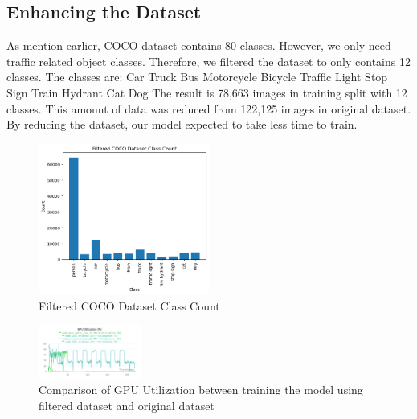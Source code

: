 \documentclass[conference]{IEEEtran}
\begin{document}
\subsection{Enhancing the Dataset}\label{Filtering}
As mention earlier, COCO dataset contains 80 classes. However, we only need traffic related object classes.
Therefore, we filtered the dataset to only contains 12 classes. The classes are:
Car Truck Bus Motorcycle Bicycle Traffic Light Stop Sign Train Hydrant Cat Dog
The result is 78,663 images in training split with 12 classes. This amount of data was reduced from 122,125 images in original dataset. By reducing the dataset, our model expected to take less time to train.
\begin{figure}[h!]
\centering
\includegraphics[width=0.5\textwidth]{filtered_coco_class_count.png}
\caption{Filtered COCO Dataset Class Count}
\label{fig:COCOFiltered}
\end{figure}

\begin{figure}[h!]
\centering
\includegraphics[width=0.3\textwidth,keepaspectratio]{gpu_utilization_comparison_original_and_filtered.png}
\caption{Comparison of GPU Utilization between training the model using filtered dataset and original dataset}
\label{fig:original_filtered_gpu_utilization}
\end{figure}
\end{document}
